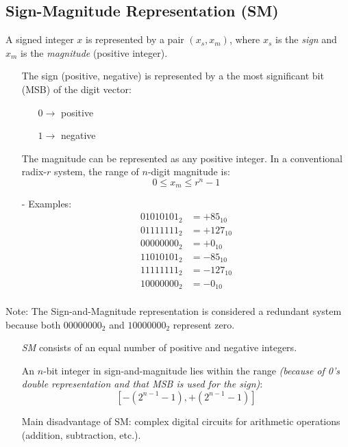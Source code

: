 \documentclass[12pt,openany, tikz,border=10pt]{book}
\begin{document}
    \subsection{Sign-Magnitude Representation (SM)}

    A signed integer \( x \) is represented by a pair \( (x_s, x_m) \), where \( x_s \) is the \textit{sign} and \( x_m \) is the \textit{magnitude} (positive integer).

    \begin{itemize}
        \item[] The sign (positive, negative) is represented by a the most significant bit (MSB) of the digit vector:
        \begin{itemize}
            \item[] \( 0 \rightarrow \) positive
            \item[] \( 1 \rightarrow \) negative
        \end{itemize}
        \item[] The magnitude can be represented as any positive integer. In a conventional radix-\( r \) system, the range of \( n \)-digit magnitude is:
        \[ 0 \leq x_m \leq r^n - 1 \]
    \end{itemize}

    \begin{itemize}
      \item[-] Examples:
      \begin{align*}
          01010101_2 &= +85_{10} \\
          01111111_2 &= +127_{10} \\
          00000000_2 &= +0_{10} \\
          11010101_2 &= -85_{10} \\
          11111111_2 &= -127_{10} \\
          10000000_2 &= -0_{10} \\
      \end{align*}
  \end{itemize}
  \newpage
  Note: The Sign-and-Magnitude representation is considered a redundant system because both \( 00000000_2 \) and \( 10000000_2 \) represent zero.

  \begin{itemize}
    \item[] \textit{SM} consists of an equal number of positive and negative integers.
    \item[] An \( n \)-bit integer in sign-and-magnitude lies within the range \textit{(because of 0's double representation and that MSB is used for the sign)}: 
    $$ [-\left(2^{n-1} - 1\right), +\left(2^{n-1} - 1\right)] $$ 
    \item[] Main disadvantage of SM: complex digital circuits for arithmetic operations (addition, subtraction, etc.).
\end{itemize}
\end{document}
